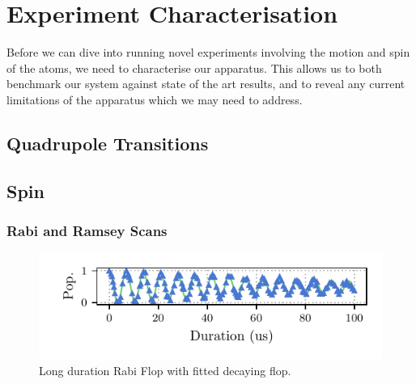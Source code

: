 \chapter{Experiment Characterisation}

    Before we can dive into running novel experiments involving the motion and spin
    of the atoms, we need to characterise our apparatus. This allows us to both
    benchmark our system against state of the art results, and to reveal any
    current limitations of the apparatus which we may need to address.

\section{Quadrupole Transitions}
\label{sec:Transitions}

\section{Spin}
\label{sec:Spin}

\subsection{Rabi and Ramsey Scans}

    \begin{figure}
        \begin{center}
        \noindent\includegraphics[width=\linewidth]{
            figures/pdf_figure/long_flop.pdf
            }
        \end{center}
        \caption{Long duration Rabi Flop with fitted decaying flop.
            }
        \label{fig:Long Flop}
    \end{figure}


